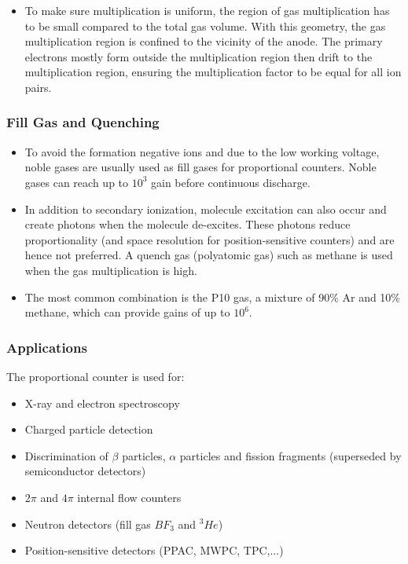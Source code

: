 \begin{itemize}
\begin{itemize}
        \item To make sure multiplication is uniform, the region of gas multiplication has to be small compared to the total gas volume. With this geometry, the gas multiplication region is confined to the vicinity of the anode. The primary electrons mostly form outside the multiplication region then drift to the multiplication region, ensuring the multiplication factor to be equal for all ion pairs. 
    \end{itemize}
\end{itemize}
\subsubsection{Fill Gas and Quenching}
\begin{itemize}
    \item To avoid the formation negative ions and due to the low working voltage, noble gases are usually used as fill gases for proportional counters. Noble gases can reach up to $10^3$ gain before continuous discharge.
    \item In addition to secondary ionization, molecule excitation can also occur and create photons when the molecule de-excites. These photons reduce proportionality (and space resolution for position-sensitive counters) and are hence not preferred. A quench gas (polyatomic gas) such as methane is used when the gas multiplication is high.  
    \item The most common combination is the P10 gas, a mixture of 90\% Ar and 10\% methane, which can provide gains of up to $10^6$.
\end{itemize}
\subsubsection{Applications}
The proportional counter is used for:
\begin{itemize}
    \item X-ray and electron spectroscopy
    \item Charged particle detection
    \item Discrimination of $\beta$ particles, $\alpha$ particles and fission fragments (superseded by semiconductor detectors)
    \item $2\pi$ and $4\pi$ internal flow counters
    \item Neutron detectors (fill gas $BF_3$ and $^3He$)
    \item Position-sensitive detectors (PPAC, MWPC, TPC,...)
\end{itemize}
